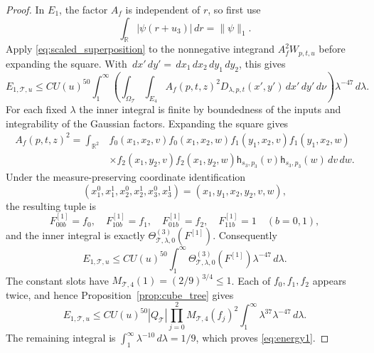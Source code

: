 \documentclass[12pt,reqno]{amsart}
\theoremstyle{plain}
\theoremstyle{definition}
\theoremstyle{remark}
\numberwithin{equation}{section}
\newcommand{\R}{\mathbb R}
\newcommand{\T}{\mathcal T}
\newcommand{\h}{\mathsf h}
\newcommand{\dd}{\,d}
\begin{document}
\begin{proof}
In $E_1$, the factor $A_f$ is independent of $r$, so first use
\[
 \int_\R|\psi(r+u_3)|\dd r=\|\psi\|_1.
\]
Apply \eqref{eq:scaled_superposition} to the nonnegative integrand
$A_f^2W_{p,t,u}$ before expanding the square. With
$\dd x'\dd y'=\dd x_1\dd x_2\dd y_1\dd y_2$, this gives
\[
 E_{1,\T,u}\le C U(u)^{50}\int_1^\infty
 \left(\int_{\Omega_\T}\int_{E_4}A_f(p,t,z)^2
                  D_{\lambda,p,t}(x',y')\dd x'\dd y'\,d\nu\right)
                        \lambda^{-47}\dd\lambda.
\]
For each fixed $\lambda$ the inner integral is finite by boundedness
of the inputs and integrability of the Gaussian factors.
Expanding the square gives
\begin{align*}
 A_f(p,t,z)^2=\int_{\R^2}
 &f_0(x_1,x_2,v)f_0(x_1,x_2,w)
  f_1(y_1,x_2,v)f_1(y_1,x_2,w)\\
 &\times f_2(x_1,y_2,v)f_2(x_1,y_2,w)
                  \h_{s_3,p_3}(v)\h_{s_3,p_3}(w)\dd v\dd w.
\end{align*}
Under the measure-preserving coordinate identification
\[
 (x_1^0,x_1^1,x_2^0,x_2^1,x_3^0,x_3^1)
                    =(x_1,y_1,x_2,y_2,v,w),
\]
the resulting tuple is
\[
 F^{[1]}_{00b}=f_0,\quad F^{[1]}_{10b}=f_1,\quad
 F^{[1]}_{01b}=f_2,\quad F^{[1]}_{11b}=1\quad(b=0,1),
\]
and the inner integral is exactly
$\Theta^{(3)}_{\T,\lambda,0}(F^{[1]})$. Consequently
\begin{equation}\label{eq:first_energy_cube_comparison}
 E_{1,\T,u}\le C U(u)^{50}\int_1^\infty
       \Theta^{(3)}_{\T,\lambda,0}(F^{[1]})\lambda^{-47}\dd\lambda.
\end{equation}
The constant slots have $M_{\T,4}(1)=(2/9)^{3/4}\le1$.
Each of $f_0,f_1,f_2$ appears twice, and hence
Proposition~\ref{prop:cube_tree} gives
\[
 E_{1,\T,u}\le C U(u)^{50}|Q_\T|
        \prod_{j=0}^2M_{\T,4}(f_j)^2
          \int_1^\infty\lambda^{37}\lambda^{-47}\dd\lambda.
\]
The remaining integral is $\int_1^\infty\lambda^{-10}\dd\lambda=1/9$,
which proves \eqref{eq:energy1}.


\end{proof}
\end{document}
